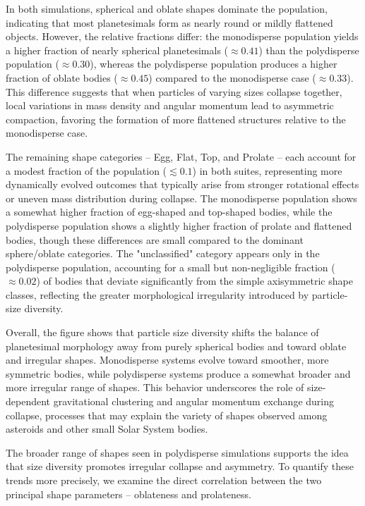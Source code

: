 \documentclass[fleqn,usenatbib]{mnras}
\begin{document}
In both simulations, spherical and oblate shapes dominate the
population, indicating that most planetesimals form as nearly round
or mildly flattened objects. However, the relative fractions differ:
the monodisperse population yields a higher fraction of nearly
spherical planetesimals ($\approx 0.41$) than the polydisperse
population ($\approx 0.30$), whereas the polydisperse population
produces a higher fraction of oblate bodies ($\approx 0.45$) compared
to the monodisperse case ($\approx 0.33$). This difference suggests
that when particles of varying sizes collapse together, local
variations in mass density and angular momentum lead to asymmetric
compaction, favoring the formation of more flattened structures
relative to the monodisperse case.

The remaining shape categories -- Egg, Flat, Top, and Prolate -- each
account for a modest fraction of the population ($\lesssim 0.1$) in
both suites, representing more dynamically evolved outcomes that
typically arise from stronger rotational effects or uneven mass
distribution during collapse. The monodisperse population shows a
somewhat higher fraction of egg-shaped and top-shaped bodies, while the
polydisperse population shows a slightly higher fraction of prolate
and flattened bodies, though these differences are small compared to
the dominant sphere/oblate categories. The "unclassified" category
appears only in the polydisperse population, accounting for a small
but non-negligible fraction ($\approx 0.02$) of bodies that deviate
significantly from the simple axisymmetric shape classes, reflecting
the greater morphological irregularity introduced by particle-size
diversity.

Overall, the figure shows that particle size diversity shifts the
balance of planetesimal morphology away from purely spherical bodies
and toward oblate and irregular shapes. Monodisperse systems evolve
toward smoother, more symmetric bodies, while polydisperse systems
produce a somewhat broader and more irregular range of shapes. This
behavior underscores the role of size-dependent gravitational
clustering and angular momentum exchange during collapse, processes
that may explain the variety of shapes observed among asteroids and
other small Solar System bodies.

The broader range of shapes seen in polydisperse simulations supports
the idea that size diversity promotes irregular collapse and
asymmetry. To quantify these trends more precisely, we examine the
direct correlation between the two principal shape parameters --
oblateness and prolateness.
\end{document}
